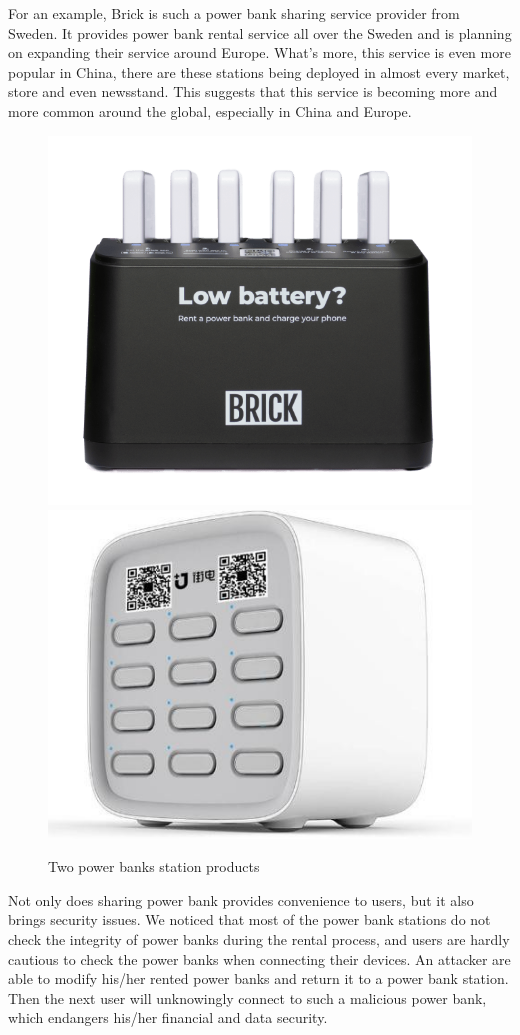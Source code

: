 For an example, Brick is such a power bank sharing service provider from Sweden. It provides power bank rental service all over the Sweden and is planning on expanding their service around Europe. What's more, this service is even more popular in China, there are these stations being deployed in almost every market, store and even newsstand. This suggests that this service is becoming more and more common around the global, especially in China and Europe.

\begin{figure}[t]
	\centering
	\includegraphics[width=.4 \linewidth]{./Figs/Brick_station.png}
	\includegraphics[width=.4 \linewidth]{./Figs/jiedian.jpg}
	\caption{Two power banks station products}
	\label{fig:PBS_products}
\end{figure}



Not only does sharing power bank provides convenience to users, but it also brings security issues.
We noticed that most of the power bank stations do not check the integrity of power banks during the rental process, and users are hardly cautious to check the power banks when connecting their devices.
An attacker are able to modify his/her rented power banks and return it to a power bank station.
Then the next user will unknowingly connect to such a malicious power bank, which endangers his/her financial and data security.


